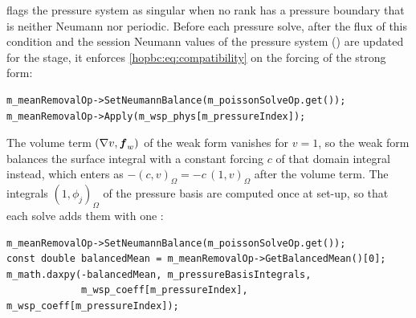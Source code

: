  flags the pressure system as singular when
no rank has a pressure boundary that is neither Neumann nor periodic. Before
each pressure solve, after the flux of this condition and the session
Neumann values of the pressure system () are
updated for the stage, it enforces \eqref{hopbc:eq:compatibility} on the
forcing of the strong form:
\begin{lstlisting}[style=C++Style]
m_meanRemovalOp->SetNeumannBalance(m_poissonSolveOp.get());
m_meanRemovalOp->Apply(m_wsp_phys[m_pressureIndex]);
\end{lstlisting}
The volume term \((\nabla v,\boldsymbol{f}_w)\) of the weak form vanishes for
\(v=1\), so the weak form balances the surface integral with a constant
forcing \(c\) of that domain integral instead, which enters as
\(-(c,v)_\Omega=-c\,(1,v)_\Omega\) after the volume term. The integrals
\((1,\phi_j)_\Omega\) of the pressure basis are computed once at set-up, so
that each solve adds them with one :
\begin{lstlisting}[style=C++Style]
m_meanRemovalOp->SetNeumannBalance(m_poissonSolveOp.get());
const double balancedMean = m_meanRemovalOp->GetBalancedMean()[0];
m_math.daxpy(-balancedMean, m_pressureBasisIntegrals,
             m_wsp_coeff[m_pressureIndex], m_wsp_coeff[m_pressureIndex]);
\end{lstlisting}

